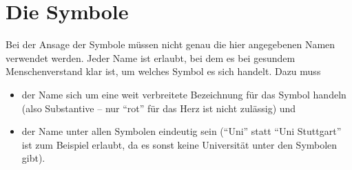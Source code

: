 \documentclass[paper=81mm:81mm]{scrartcl}
\begin{document}
\section*{Die Symbole}

Bei der Ansage der Symbole müssen nicht genau die hier angegebenen Namen verwendet werden.
Jeder Name ist erlaubt, bei dem es bei gesundem Menschenverstand klar ist,
um welches Symbol es sich handelt.
Dazu muss
\begin{itemize}
  \item
  der Name sich um eine weit verbreitete Bezeichnung für das Symbol handeln
  (also Substantive -- nur "`rot"' für das Herz ist nicht zulässig) und

  \item
  der Name unter allen Symbolen eindeutig sein
  ("`Uni"' statt "`Uni Stuttgart"' ist zum Beispiel erlaubt,
  da es sonst keine Universität unter den Symbolen gibt).
\end{itemize}

\pagebreak
\end{document}
